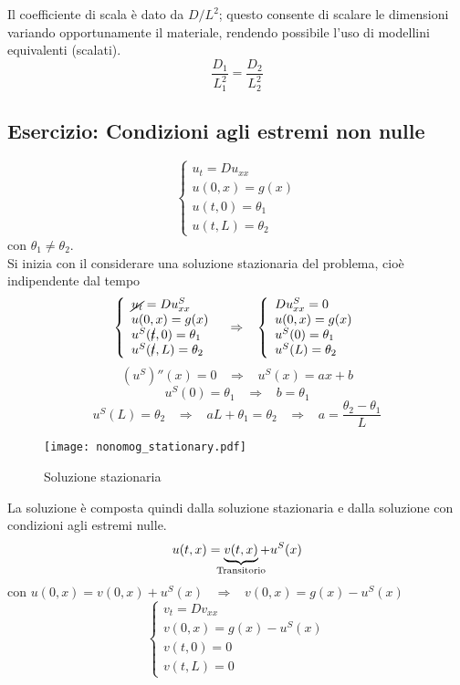 Il coefficiente di scala \`e dato da $D/L^2$; questo consente di 
scalare le dimensioni variando opportunamente il materiale, rendendo possibile
l'uso di modellini equivalenti (scalati).
\[
	\frac{D_1}{L_1^2}= \frac{D_2}{L_2^2}
\]
\subsection{Esercizio: Condizioni agli estremi non nulle}
\[
	\left\{
	\begin{array}{l}
		u_t=Du_{xx} \\
		u(0,x)=g(x) \\
		u(t,0)=\theta_1 \\
		u(t,L)=\theta_2
	\end{array}
	\right.
\]
con $\theta_1 \neq \theta_2$.\\
Si inizia con il considerare una soluzione stazionaria del problema, cio\`e
indipendente dal tempo
\[
	\left\{
	\begin{array}{l}
		\cancel{u_t}=Du_{xx}^S \\
		u(0,x)=g(x) \\
		u^S(\cancel{t},0)=\theta_1 \\
		u^S(\cancel{t},L)=\theta_2
	\end{array}
	\right.
	\;\;\;
	\Rightarrow
	\;\;\;
	\left\{
	\begin{array}{l}
		Du_{xx}^S= 0 \\
		u(0,x)=g(x) \\
		u^S(0)=\theta_1 \\
		u^S(L)=\theta_2
	\end{array}
	\right.
\]
\[
	(u^S)''(x)=0 \;\;\; \Rightarrow \;\;\; u^S(x)=ax+b
\]
\[
	u^S(0)= \theta_1 \;\;\; \Rightarrow \;\;\; b= \theta_1
\]
\[
	u^S(L)= \theta_2 \;\;\; \Rightarrow \;\;\; aL+\theta_1= \theta_2
	\;\;\; \Rightarrow \; \; \; a= \frac{\theta_2 - \theta_1}{L}
\]
\begin{figure}[H]
	\centering
	\texttt{[image: nonomog\_stationary.pdf]}
	\caption{Soluzione stazionaria}
	\label{nonomog_stationary}
\end{figure}
La soluzione \`e composta quindi dalla soluzione stazionaria e dalla soluzione
con condizioni agli estremi nulle.
\[
	u(t,x)= \underbrace{v(t,x)}_{\mathclap{\text{Transitorio}}} + u^S(x)
\]
con $u(0,x)= v(0,x) + u^S(x) \;\;\; \Rightarrow \;\;\; v(0,x)=g(x)- u^S(x)$
\[
	\left\{
	\begin{array}{l}
		v_t=Dv_{xx} \\
		v(0,x)=g(x)- u^S(x) \\
		v(t,0)=0 \\
		v(t,L)=0
	\end{array}
	\right.
\] 
